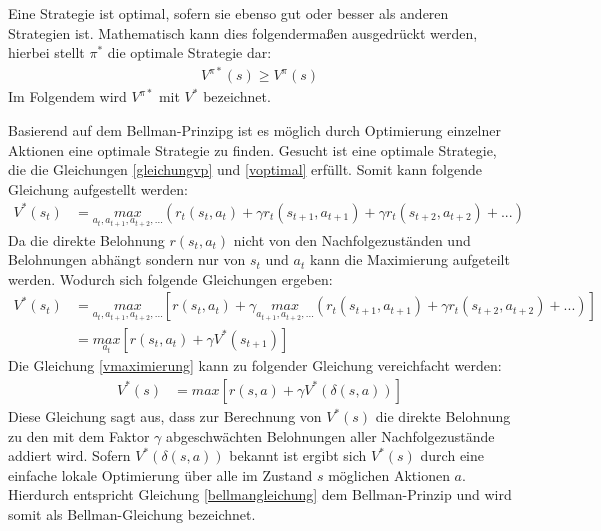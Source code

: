 \documentclass[10pt]{scrartcl}
\begin{document}
Eine Strategie ist optimal, sofern sie ebenso gut oder besser als anderen Strategien ist. 
Mathematisch kann dies folgendermaßen ausgedrückt werden, hierbei stellt $\pi^*$ die optimale Strategie dar:
\begin{align}\label{voptimal}
V^{\pi*}(s)\geq V^\pi(s)
\end{align}
Im Folgendem wird $V^{\pi*}$ mit $V^*$ bezeichnet.

Basierend auf dem Bellman-Prinzipg ist es möglich durch Optimierung einzelner Aktionen eine optimale Strategie zu finden. Gesucht ist eine optimale Strategie, die die Gleichungen \ref{gleichungvp} und \ref{voptimal} erfüllt. Somit kann folgende Gleichung aufgestellt werden:
\begin{align}
V^*(s_t) &= \underset{a_t,a_{t+1}, a_{t+2},...}{max}(r_t(s_t,a_t) + \gamma r_t(s_{t+1},a_{t+1}) + \gamma r_t(s_{t+2},a_{t+2}) + ...)
\end{align}
Da die direkte Belohnung $r(s_t, a_t)$ nicht von den Nachfolgezuständen und Belohnungen abhängt sondern nur  von $s_t$ und $a_t$ kann die Maximierung aufgeteilt werden. Wodurch sich folgende Gleichungen ergeben:
\begin{align}
V^*(s_t) &= \underset{a_t,a_{t+1}, a_{t+2},...}{max}[r(s_t, a_t) + \gamma \underset{a_{t+1},a_{t+2},...}{max}(r_t(s_{t+1},a_{t+1}) + \gamma r_t(s_{t+2},a_{t+2}) + ...)]\\
&= \underset{a_t}{max}[r(s_t, a_t)+\gamma V^*(s_{t+1})]\label{vmaximierung}
\end{align}
Die Gleichung \ref{vmaximierung} kann zu folgender Gleichung  vereichfacht werden:
\begin{align}\label{bellmangleichung}
V^*(s) &= max[r(s,a) + \gamma V^*(\delta(s,a))]
\end{align}
Diese Gleichung sagt aus, dass zur Berechnung von $V^*(s)$ die direkte Belohnung zu den mit dem Faktor $\gamma$ abgeschwächten Belohnungen aller Nachfolgezustände addiert wird. Sofern $V^*(\delta(s,a))$ bekannt ist ergibt sich $V^*(s)$ durch eine einfache lokale Optimierung über alle im Zustand $s$ möglichen Aktionen $a$. Hierdurch entspricht Gleichung \ref{bellmangleichung} dem Bellman-Prinzip und wird somit als Bellman-Gleichung bezeichnet.
\end{document}
